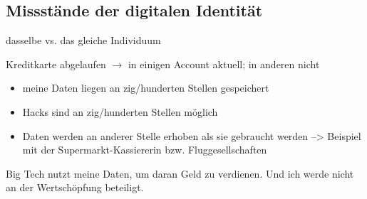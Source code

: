 \vspace{0.3cm}

\vspace{0.5cm}

\subsection{Missstände der digitalen Identität}
\label{sec:einleitung_probleme_digitaler_identitaet}

\vspace{0.3cm}

\begin{Problem}

dasselbe vs. das gleiche Individuum

\end{Problem}

\vspace{0.3cm}


\begin{Problem}

Kreditkarte abgelaufen $\rightarrow$ in einigen Account aktuell; in anderen nicht

\end{Problem}

\vspace{0.3cm}


\begin{Problem}[Datenschutz]

\begin{itemize}
  \item meine Daten liegen an zig/hunderten Stellen gespeichert
  \item Hacks sind an zig/hunderten Stellen möglich
  \item Daten werden an anderer Stelle erhoben als sie gebraucht werden --> Beispiel mit der Supermarkt-Kassiererin bzw. Fluggesellschaften
\end{itemize}

\end{Problem}

\vspace{0.3cm}


\begin{Problem}

Big Tech nutzt meine Daten, um daran Geld zu verdienen. Und ich werde nicht an der Wertschöpfung beteiligt.

\end{Problem}


